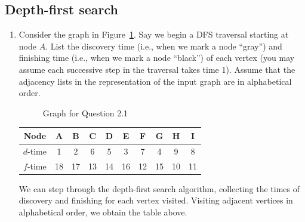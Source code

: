 \subsection{Depth-first search}

\begin{enumerate}
\item 
Consider the graph in Figure~\ref{fig:box2}. Say we begin a DFS traversal starting at node $A$. List the discovery time (i.e., when we mark a node ``gray'') and finishing time (i.e., when we mark a node ``black'') of each vertex (you may assume each successive step in the traversal takes time 1). Assume that the adjacency lists in the representation of the input graph are in alphabetical order.
\begin{figure}[h!]
\centering
    \caption{Graph for Question 2.1}
          \label{fig:box2}
\centering
\end{figure}
    \begin{center}
    \begin{tabular}{|c|c|c|c|c|c|c|c|c|c|}
    \hline
         Node & A & B & C & D & E & F & G & H & I\\
         \hline 
         $d$-time & 1 & 2 & 6 & 5 & 3 & 7 & 4 & 9 & 8 \\
         \hline
         $f$-time & 18 & 17 & 13 & 14 & 16 & 12 & 15 & 10 & 11 \\
         \hline
    \end{tabular}
    \end{center}
\begin{solution}
We can step through the depth-first search algorithm, collecting the times of discovery and finishing for each vertex visited. Visiting adjacent vertices in alphabetical order, we obtain the table above.
\end{solution}
\end{enumerate}    
